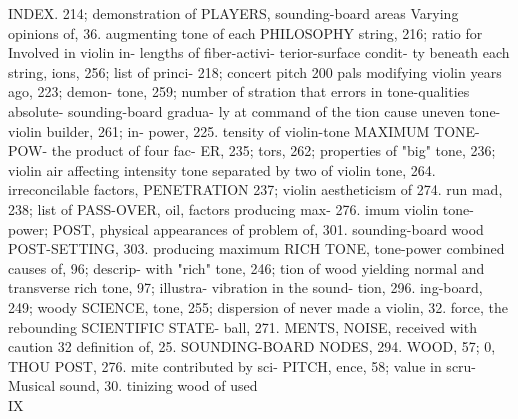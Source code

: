 INDEX. 214; demonstration of PLAYERS, sounding-board areas Varying opinions of, 36. augmenting tone of each PHILOSOPHY string, 216; ratio for Involved in violin in- lengths of fiber-activi- terior-surface condit- ty beneath each string, ions, 256; list of princi- 218; concert pitch 200 pals modifying violin years ago, 223; demon- tone, 259; number of stration that errors in tone-qualities absolute- sounding-board gradua- ly at command of the tion cause uneven tone- violin builder, 261; in- power, 225. tensity of violin-tone MAXIMUM TONE-POW- the product of four fac- ER, 235; tors, 262; properties of "big" tone, 236; violin air affecting intensity tone separated by two of violin tone, 264. irreconcilable factors, PENETRATION 237; violin aestheticism of 274. run mad, 238; list of PASS-OVER, oil, factors producing max- 276. imum violin tone-power; POST, physical appearances of problem of, 301. sounding-board wood POST-SETTING, 303. producing maximum RICH TONE, tone-power combined causes of, 96; descrip- with "rich" tone, 246; tion of wood yielding normal and transverse rich tone, 97; illustra- vibration in the sound- tion, 296. ing-board, 249; woody SCIENCE, tone, 255; dispersion of never made a violin, 32. force, the rebounding SCIENTIFIC STATE- ball, 271. MENTS, NOISE, received with caution 32 definition of, 25. SOUNDING-BOARD NODES, 294. WOOD, 57; 0, THOU POST, 276. mite contributed by sci- PITCH, ence, 58; value in scru- Musical sound, 30. tinizing wood of used\\
IX\\